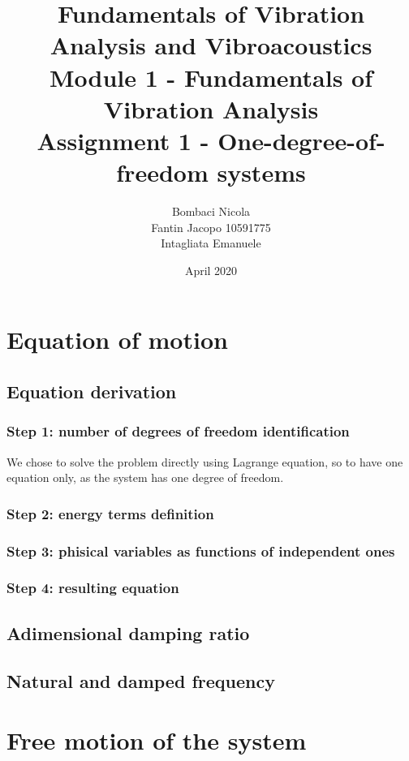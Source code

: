 \documentclass[a4paper,12pt,oneside]{article}
\title{Fundamentals of Vibration Analysis and Vibroacoustics \\
Module 1 - Fundamentals of Vibration Analysis \\
Assignment 1 - One-degree-of-freedom systems}
\author{Bombaci Nicola \\
Fantin Jacopo 10591775 \\
Intagliata Emanuele}
\date{April 2020}
\begin{document}
\maketitle

\section{Equation of motion}

\subsection{Equation derivation}

\subsubsection*{Step 1: number of degrees of freedom identification}

We chose to solve the problem directly using Lagrange equation, so to have one equation only, as the system has one degree of freedom.

\subsubsection*{Step 2: energy terms definition}



\subsubsection*{Step 3: phisical variables as functions of independent ones}



\subsubsection*{Step 4: resulting equation}



\subsection{Adimensional damping ratio}



\subsection{Natural and damped frequency}



\section{Free motion of the system}
\end{document}

